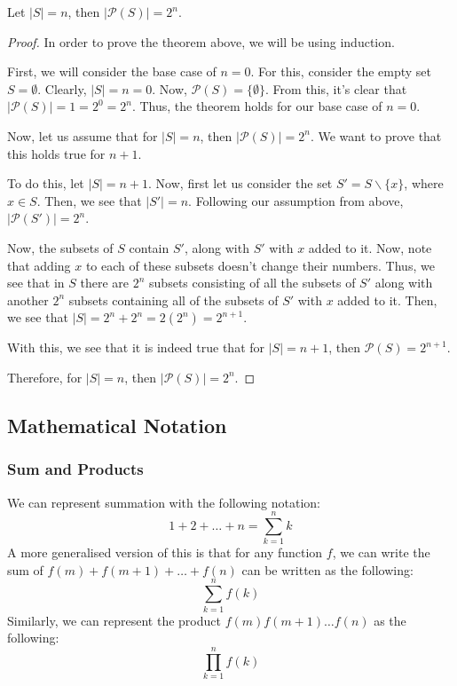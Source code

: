 \documentclass[openany]{book}
\let\oldprod\prod
\renewcommand{\prod}[2]{\oldprod\limits_{#1}^{#2}}
\let\oldsum\sum
\renewcommand{\sum}[2]{\oldsum\limits_{#1}^{#2}}
\begin{document}
\begin{theorem}
	Let $\lvert S\rvert=n$, then $\lvert\mathscr{P}(S)\rvert=2^n$.
\end{theorem}
\begin{proof}
	In order to prove the theorem above, we will be using induction.
	
	First, we will consider the base case of $n=0$. For this, consider the empty set $S=\emptyset$. Clearly, $\lvert S\rvert = n = 0$. Now, $\mathscr{P}(S)=\{\emptyset\}$. From this, it's clear that $\lvert\mathscr{P}(S)\rvert=1=2^0=2^n$. Thus, the theorem holds for our base case of $n=0$.
	
	Now, let us assume that for $\lvert S\rvert=n$, then $\lvert\mathscr{P}(S)\rvert=2^n$. We want to prove that this holds true for $n+1$.
	
	To do this, let $\lvert S \rvert = n+1$. Now, first let us consider the set $S'=S\backslash\{x\}$, where $x\in S$. Then, we see that $\lvert S'\rvert = n$. Following our assumption from above, $\lvert\mathscr{P}(S')\rvert=2^n$. 
	
	Now, the subsets of $S$ contain $S'$, along with $S'$ with $x$ added to it. Now, note that adding $x$ to each of these subsets doesn't change their numbers. Thus, we see that in $S$ there are $2^n$ subsets consisting of all the subsets of $S'$ along with another $2^n$ subsets containing all of the subsets of $S'$ with $x$ added to it. Then, we see that $\lvert S\rvert=2^n + 2^n = 2(2^n) = 2^{n+1}$.
	
	With this, we see that it is indeed true that for $\lvert S\rvert=n+1$, then $\mathscr{P}(S)=2^{n+1}$.
	
	Therefore, for $\lvert S\rvert=n$, then $\lvert\mathscr{P}(S)\rvert=2^n$.
\end{proof}

\subsection{Mathematical  Notation}
\subsubsection{Sum and Products} We can represent summation with the following notation:
\begin{equation*}
	1+2+\ldots+n = \sum{k=1}{n} k
\end{equation*}
A more generalised version of this is that for any function $f$, we can write the sum of $f(m)+f(m+1)+\ldots+f(n)$ can be written as the following:
\begin{equation*}
	\sum{k=1}{n} f(k)
\end{equation*}
Similarly, we can represent the product $f(m)f(m+1)\ldots f(n)$ as the following:
\begin{equation*}
	\prod{k=1}{n} f(k)
\end{equation*}
\end{document}
